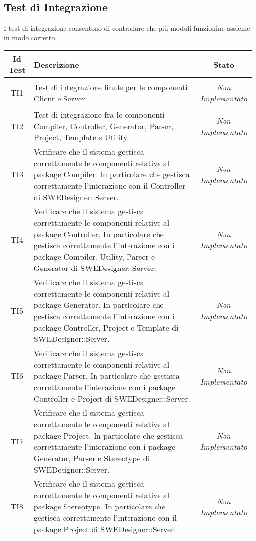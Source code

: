 	\subsection{Test di Integrazione}
	I test di integrazione consentono di controllare che più moduli funzionino assieme in modo corretto.
\normalsize
\begin{longtable}{|c|>{}m{8cm}|c|}
\hline 
\textbf{Id Test} & \textbf{Descrizione} & \textbf{Stato}\\
\hline
\endhead
\hypertarget{TI1}{TI1} & Test di integrazione finale per le componenti Client e Server & \textit{Non Implementato}\\ \hline
\hypertarget{TI2}{TI2} & Test di integrazione fra le componenti Compiler, Controller, Generator, Parser, Project, Template e Utility. & \textit{Non Implementato}\\ \hline
\hypertarget{TI3}{TI3} & Verificare che il sistema gestisca correttamente le componenti relative al package Compiler. In particolare che gestisca correttamente l'interazione con il Controller di SWEDesigner::Server. & \textit{Non Implementato}\\ \hline
\hypertarget{TI4}{TI4} & Verificare che il sistema gestisca correttamente le componenti relative al package Controller. In particolare che gestisca correttamente l'interazione con i package Compiler, Utility, Parser e Generator di SWEDesigner::Server. & \textit{Non Implementato}\\ \hline
\hypertarget{TI5}{TI5} & Verificare che il sistema gestisca correttamente le componenti relative al package Generator. In particolare che gestisca correttamente l'interazione con i package Controller, Project e Template di SWEDesigner::Server. & \textit{Non Implementato}\\ \hline
\hypertarget{TI6}{TI6} & Verificare che il sistema gestisca correttamente le componenti relative al package Parser. In particolare che gestisca correttamente l'interazione con i package Controller e Project di SWEDesigner::Server. & \textit{Non Implementato}\\ \hline
\hypertarget{TI7}{TI7} & Verificare che il sistema gestisca correttamente le componenti relative al package Project. In particolare che gestisca correttamente l'interazione con i package Generator, Parser e Stereotype di SWEDesigner::Server. & \textit{Non Implementato}\\ \hline
\hypertarget{TI8}{TI8} & Verificare che il sistema gestisca correttamente le componenti relative al package Stereotype. In particolare che gestisca correttamente l'interazione con il package Project di SWEDesigner::Server. & \textit{Non Implementato}\\ \hline

\end{longtable}
